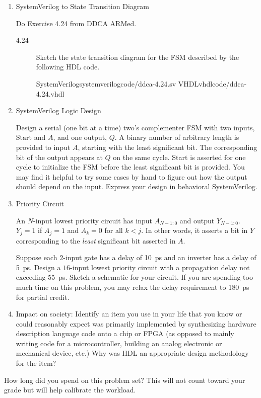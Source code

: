\documentclass{e85}
\date{2019}
\author{}
\begin{document}
\begin{enumerate}
\item SystemVerilog to State Transition Diagram

  Do Exercise 4.24 from DDCA ARMed.

  \begin{description}
  \item[4.24] Sketch the state transition diagram for the FSM
    described by the following HDL code.
    \begin{center}
      \twocolumnlisting
      {SystemVerilog}{systemverilog}{code/ddca-4.24.sv}
      {VHDL}{vhdl}{code/ddca-4.24.vhdl}
    \end{center}
    \begin{solution}
    \end{solution}
  \end{description}

\item SystemVerilog Logic Design

  Design a serial (one bit at a time) two's complementer FSM with two
  inputs, \(\mathrm{Start}\) and \(A\), and one output, \(Q\).  A
  binary number of arbitrary length is provided to input \(A\),
  starting with the least significant bit.  The corresponding bit of
  the output appears at \(Q\) on the same cycle.  Start is asserted
  for one cycle to initialize the FSM before the least significant bit
  is provided.  You may find it helpful to try some cases by hand to
  figure out how the output should depend on the input.  Express your
  design in behavioral SystemVerilog.
  \begin{solution}
  \end{solution}

\item Priority Circuit

  An \(N\)-input lowest priority circuit has input \(A_{N-1:0}\) and
  output \(Y_{N-1:0}\).  \(Y_j = 1\) if \(A_j = 1\) and \(A_k = 0\)
  for all \(k<j\).  In other words, it asserts a bit in \(Y\)
  corresponding to the \emph{least} significant bit asserted in \(A\).

  Suppose each \(2\)-input gate has a delay of \SI{10}{\ps} and an
  inverter has a delay of \SI{5}{\ps}.  Design a \(16\)-input lowest
  priority circuit with a propagation delay not exceeding
  \SI{55}{\ps}.  Sketch a schematic for your circuit.  If you are
  spending too much time on this problem, you may relax the delay
  requirement to \SI{180}{\ps} for partial credit.
  \begin{solution}
  \end{solution}

\item Impact on society: Identify an item you use in your life that
  you know or could reasonably expect was primarily implemented by
  synthesizing hardware description language code onto a chip or FPGA
  (as opposed to mainly writing code for a microcontroller, building
  an analog electronic or mechanical device, etc.)  Why was HDL an
  appropriate design methodology for the item?
  \begin{solution}
  \end{solution}
\end{enumerate}

How long did you spend on this problem set?  This will not count
toward your grade but will help calibrate the workload.
\begin{solution}
\end{solution}
\end{document}
